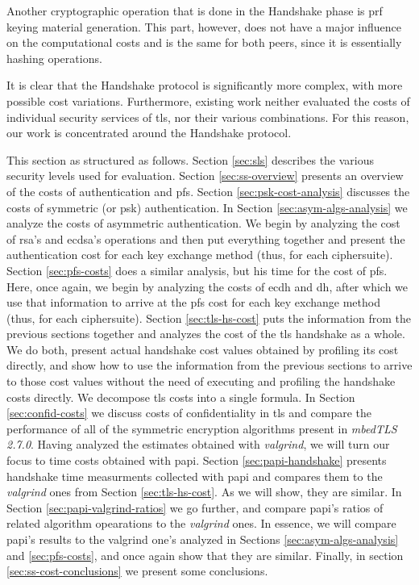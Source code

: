 Another cryptographic operation that is done in the Handshake phase is \gls{prf} keying material generation. This part, however,
does not have a major influence on the computational costs and is the same for both peers, since it is essentially
hashing operations.

It is clear that the Handshake protocol is significantly more complex, with more possible cost variations.
Furthermore, existing work neither evaluated the costs of individual security services of \gls{tls}, nor
their various combinations. For this reason, our work is concentrated around the Handshake protocol.

This section as structured as follows. Section \ref{sec:sls} describes the various security levels used for evaluation. 
Section \ref{sec:ss-overview}
presents an overview of the costs of authentication and \gls{pfs}. Section \ref{sec:psk-cost-analysis} discusses the costs of symmetric (or \gls{psk})
authentication. In Section \ref{sec:asym-algs-analysis} we analyze the costs of asymmetric authentication. We begin by analyzing the cost of \gls{rsa}'s
and \gls{ecdsa}'s  operations and then put everything together and present the authentication cost for each key exchange method (thus, for each ciphersuite).
Section \ref{sec:pfs-costs} does a similar analysis, but his time for the cost of \gls{pfs}. Here, once again, we begin by analyzing the costs of
\gls{ecdh} and \gls{dh}, after which we use that information to arrive at the \gls{pfs} cost for each key exchange method (thus, for each ciphersuite).
Section \ref{sec:tls-hs-cost} puts the information from the previous sections together and analyzes the cost of the \gls{tls} handshake as a whole.
We do both, present actual handshake cost values obtained by profiling its cost directly, and show how to use the information from the previous sections to 
arrive to those cost values without the need of executing and profiling the handshake costs directly. We decompose \gls{tls} costs into a single formula.
In Section \ref{sec:confid-costs} we discuss costs of confidentiality in \gls{tls} and compare the performance of all of the symmetric encryption algorithms
present in \textit{mbedTLS 2.7.0}. Having analyzed the estimates obtained with \textit{valgrind}, we will turn our focus to time costs obtained with \gls{papi}.
Section \ref{sec:papi-handshake} presents handshake time measurments collected with \gls{papi} and compares them to
the \textit{valgrind} ones from Section \ref{sec:tls-hs-cost}. As we will show, they are similar. In Section \ref{sec:papi-valgrind-ratios} we go further,
and compare \gls{papi}'s ratios of related algorithm opearations to the \textit{valgrind} ones. In essence, we will compare \gls{papi}'s results to the valgrind
one's analyzed in Sections \ref{sec:asym-algs-analysis} and \ref{sec:pfs-costs}, and once again show that they are similar.
Finally, in section \ref{sec:ss-cost-conclusions} we present some conclusions.

